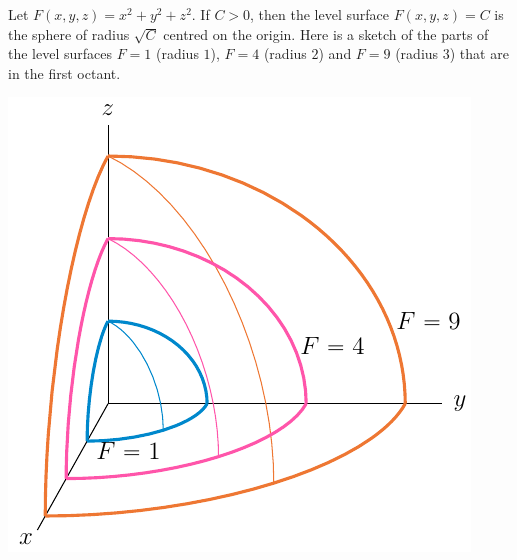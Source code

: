 \bigskip\goodbreak
\begin{eg}[$F(x,y,z)=x^2+y^2+z^2$]\label{eg level surface sphere}
Let $F(x,y,z)=x^2+y^2+z^2$. If $C>0$, then the level surface
$F(x,y,z)=C$ is the sphere of radius $\sqrt{C}$ centred on the origin.
Here is a sketch of the parts of the level surfaces 
           $F=1$ (radius $1$), 
           $F=4$ (radius $2$) and 
           $F=9$ (radius $3$)
that are in the first octant.
\begin{efig}
\begin{center}
   \includegraphics{spherA.pdf}
\end{center}
\end{efig}
\end{eg}
 


